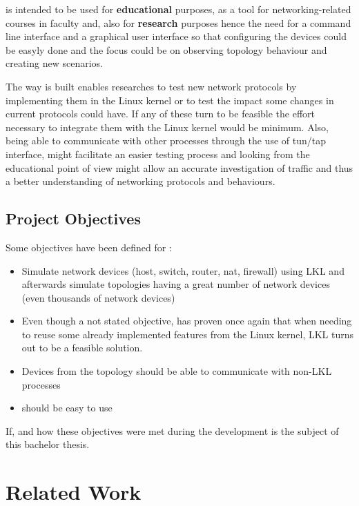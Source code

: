 \project is intended to be used for \textbf{educational} purposes, as a tool for networking-related courses in faculty and, also for \textbf{research} purposes hence the need for a command line interface and a graphical user interface so that configuring the devices could be easyly done and the focus could be on observing topology behaviour and creating new scenarios.

The way \project is built enables researches to test new network protocols by implementing them in the Linux kernel or to test the impact some changes in current protocols could have. If any of these turn to be feasible the effort necessary to integrate them with the Linux kernel would be minimum. Also, being able to communicate with other processes through the use of tun/tap interface, might facilitate an easier testing process and looking from the educational point of view might allow an accurate investigation of traffic and thus a better understanding of networking protocols and behaviours.  

\subsection{Project Objectives}
\label{sub-sec:proj-objectives}
Some objectives have been defined for \project:
\begin{itemize}
\item Simulate network devices (host, switch, router, nat, firewall) using LKL and afterwards simulate topologies having a great number of network devices (even thousands of network devices)
\item Even though a not stated objective, \project has proven once again that when needing to reuse some already implemented features from the Linux kernel, LKL turns out to be a feasible solution.
\item Devices from the topology should be able to communicate with non-LKL processes
\item \project should be easy to use
\end{itemize}

If, and how these objectives were met during the \project development is the subject of this bachelor thesis.
\section{Related Work}
\label{sec:proj-related}

